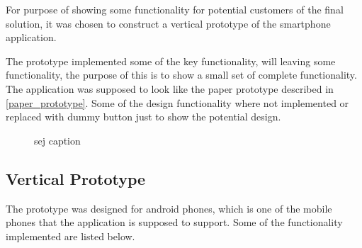 For purpose of showing some functionality for potential customers of the final solution, it was chosen to construct a vertical prototype of the smartphone application.

The prototype implemented some of the key functionality, will leaving some functionality, the purpose of this is to show a small set of complete functionality. The application was supposed to look like the paper prototype described in \cref{paper_prototype}. Some of the design functionality where not implemented or replaced with dummy button just to show the potential design.  

\begin{figure}[h!]
  \centering
  \caption{sej caption}
\end{figure}

\subsection{Vertical Prototype}
\label{sub:vertical_prototype}
The prototype was designed for android phones, which is one of the mobile phones that the application is supposed to support. Some of the functionality implemented are listed below. 

